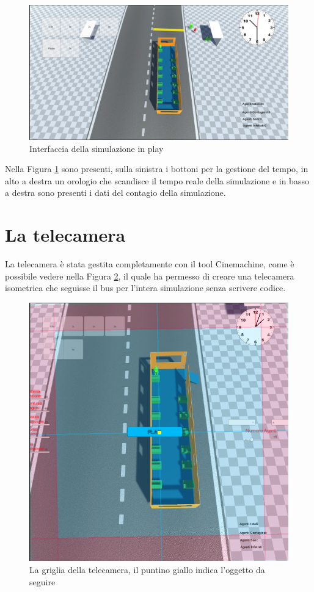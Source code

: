\documentclass[12pt, openany]{book}
\begin{document}
 	\begin{figure}[H]
 		\centering
 		\includegraphics[width=0.8\linewidth]{"Immagini/PlayGui.png"}
 		\caption{Interfaccia della simulazione in play}
 		\label{fig:InterfacciaPlay}
 	\end{figure}
 	Nella Figura \ref{fig:InterfacciaPlay} sono presenti, sulla sinistra i bottoni per la gestione del tempo, in alto a destra un orologio che scandisce il tempo reale della simulazione e in basso a destra sono presenti i dati del contagio della simulazione.
 	\section{La telecamera}
 	La telecamera è stata gestita completamente con il tool Cinemachine, come è possibile vedere nella Figura \ref{fig:Cinemachine}, il quale ha permesso di creare una telecamera isometrica che seguisse il bus per l'intera simulazione senza scrivere codice.
 	\begin{figure}[H]
 		\centering
 		\includegraphics[width=0.7\linewidth]{"Immagini/Cinemachine.png"}
 		\caption{La griglia della telecamera, il puntino giallo indica l'oggetto da seguire}
 		\label{fig:Cinemachine}
 	\end{figure}
\end{document}
